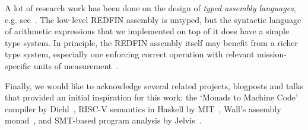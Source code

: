 A lot of research work has been done on the design of \emph{typed assembly
languages}, e.g. see~\cite{Haas:2017:BWU:3140587.3062363}\cite{Morrisett:1999:SFT:319301.319345}.
The low-level REDFIN assembly is untyped, but the syntactic language of
arithmetic expressions that we implemented on top of it does have a simple type
system. In principle, the REDFIN assembly itself may benefit from a richer type
system, especially one enforcing correct operation with relevant mission-specific
units of measurement~\cite{Kennedy:1997:RPU:263699.263761}.

Finally, we would like to acknowledge several related projects, blogposts and talks
that provided an initial inspiration for this work: the `Monads to Machine
Code' compiler by Diehl~\cite{diehl-monads-to-machines}, RISC-V semantics in Haskell
by MIT~\cite{riscv-semantics}, Wall's assembly monad~\cite{asm-monad}, and
SMT-based program analysis by Jelvis~\cite{haskell-z3}.